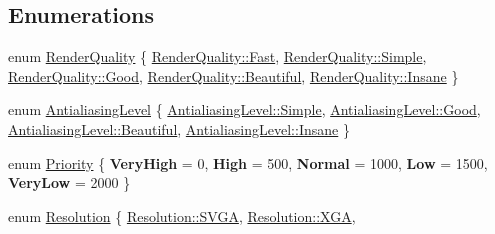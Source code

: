 \subsection*{Enumerations}
\begin{DoxyCompactItemize}
\item 
enum \hyperlink{group__gfx__group_gac3b4955f341cea44f53f8446d734cd54}{Render\+Quality} \{ \newline
\hyperlink{group__gfx__group_ggac3b4955f341cea44f53f8446d734cd54ae16b5b7f26f54214445cbe38d72c2828}{Render\+Quality\+::\+Fast}, 
\hyperlink{group__gfx__group_ggac3b4955f341cea44f53f8446d734cd54a1fbb1e3943c2c6c560247ac8f9289780}{Render\+Quality\+::\+Simple}, 
\hyperlink{group__gfx__group_ggac3b4955f341cea44f53f8446d734cd54a0c6ad70beb3a7e76c3fc7adab7c46acc}{Render\+Quality\+::\+Good}, 
\hyperlink{group__gfx__group_ggac3b4955f341cea44f53f8446d734cd54a9c8c29335006d9e40eef25192524c99f}{Render\+Quality\+::\+Beautiful}, 
\newline
\hyperlink{group__gfx__group_ggac3b4955f341cea44f53f8446d734cd54a77529ad508ab7d3b5a99adc7e711040b}{Render\+Quality\+::\+Insane}
 \}
\item 
enum \hyperlink{group__gfx__group_ga7bcac32f8bae9bfd1f21655d4734efe8}{Antialiasing\+Level} \{ \hyperlink{group__gfx__group_gga7bcac32f8bae9bfd1f21655d4734efe8a1fbb1e3943c2c6c560247ac8f9289780}{Antialiasing\+Level\+::\+Simple}, 
\hyperlink{group__gfx__group_gga7bcac32f8bae9bfd1f21655d4734efe8a0c6ad70beb3a7e76c3fc7adab7c46acc}{Antialiasing\+Level\+::\+Good}, 
\hyperlink{group__gfx__group_gga7bcac32f8bae9bfd1f21655d4734efe8a9c8c29335006d9e40eef25192524c99f}{Antialiasing\+Level\+::\+Beautiful}, 
\hyperlink{group__gfx__group_gga7bcac32f8bae9bfd1f21655d4734efe8a77529ad508ab7d3b5a99adc7e711040b}{Antialiasing\+Level\+::\+Insane}
 \}
\item 
enum \hyperlink{group__srv__group_gaf164c3f1c393e1f240458ae4fcd484a0}{Priority} \{ \newline
{\bfseries Very\+High} = 0, 
{\bfseries High} = 500, 
{\bfseries Normal} = 1000, 
{\bfseries Low} = 1500, 
\newline
{\bfseries Very\+Low} = 2000
 \}
\item 
enum \hyperlink{group__srv__group_ga68a91c7015964dbdea802829ae5ccb3c}{Resolution} \{ \newline
\hyperlink{group__srv__group_gga68a91c7015964dbdea802829ae5ccb3ca55a1cd59378161f3d8d162f7ab3c688c}{Resolution\+::\+S\+V\+GA}, 
\hyperlink{group__srv__group_gga68a91c7015964dbdea802829ae5ccb3ca8d1b2ed4d604a6be96ad2f218592b98e}{Resolution\+::\+X\+GA}, 

\end{DoxyCompactItemize}
